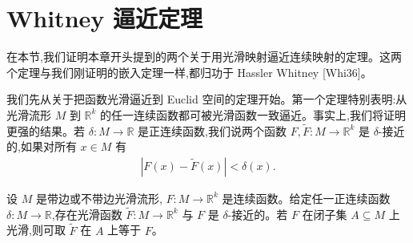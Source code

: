 \documentclass[../../main.tex]{subfiles}
\begin{document}
\section{Whitney 逼近定理}\label{section:ch06-Whitney逼近定理}

在本节,我们证明本章开头提到的两个关于用光滑映射逼近连续映射的定理。这两个定理与我们刚证明的嵌入定理一样,都归功于 Hassler Whitney [Whi36]。

我们先从关于把函数光滑逼近到 Euclid 空间的定理开始。第一个定理特别表明:从光滑流形 $M$ 到 $\mathbb{R}^k$ 的任一连续函数都可被光滑函数一致逼近。事实上,我们将证明更强的结果。若 $\delta:M\to\mathbb{R}$ 是正连续函数,我们说两个函数 $F,\widetilde{F}:M\to\mathbb{R}^k$ 是 $\delta$-接近的,如果对所有 $x\in M$ 有
\begin{align*}
|F(x)-\widetilde{F}(x)|<\delta(x).
\end{align*}

\begin{theorem}\label{theorem:ch06-approx-functions}
设 $M$ 是带边或不带边光滑流形, $F:M\to\mathbb{R}^k$ 是连续函数。给定任一正连续函数 $\delta:M\to\mathbb{R}$,存在光滑函数 $\widetilde{F}:M\to\mathbb{R}^k$ 与 $F$ 是 $\delta$-接近的。若 $F$ 在闭子集 $A\subseteq M$ 上光滑,则可取 $\widetilde{F}$ 在 $A$ 上等于 $F$。
\end{theorem}
\end{document}
